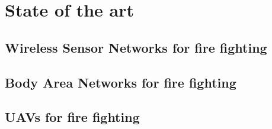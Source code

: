 
\chapter{State of the art}
\label{chapter:stateoftheart}

\section{Wireless Sensor Networks for fire fighting}

\section{Body Area Networks for fire fighting}

\section{UAVs for fire fighting}